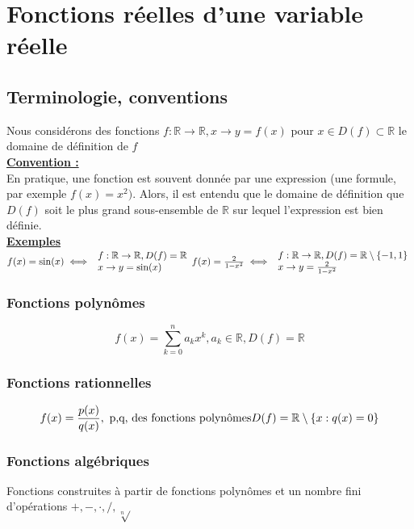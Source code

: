 \documentclass[12pt,a4paper]{article}
\newcommand{\somme}[2]{\ensuremath{\sum\limits_{#2}^{#1}}}
\newcommand{\evid}[1]{\textbf{\underline{#1}}}
\newcommand{\R}{\ensuremath{\mathbb{R}} }
\newcommand{\rtor}{\ensuremath{\R \to \R} }
\begin{document}
{\section{Fonctions réelles d'une variable réelle}
\setcounter{equation}{0}
\subsection{Terminologie, conventions}
Nous considérons des fonctions $f:\rtor, x \to y = f(x)$ pour $x \in D(f) \subset \R$ le domaine de définition de $f$\\
\evid{Convention :}\\
En pratique, une fonction est souvent donnée par une expression (une formule, par exemple $f(x) = x^2)$. Alors, il est entendu que le domaine de définition que $D(f)$ soit le plus grand sous-ensemble de \R sur lequel l'expression est bien définie.\\
\evid{Exemples}\\
$f(x) = \sin(x) \iff \begin{array}{l}
f:\rtor, D(f)	 = \R\\
x \to y = \sin(x)
\end{array}\\
f(x) = \frac{2}{1-x^2} \iff \begin{array}{l}
f:\rtor, D(f) = \R\setminus\{-1,1\}\\
x\to y = \frac{2}{1-x^2}
\end{array}$
\subsubsection{Fonctions polynômes}
\begin{equation}
	f(x) = \somme{n}{k = 0}a_k x^k, a_k \in \R, D(f) = \R
\end{equation}

\subsubsection{Fonctions rationnelles}
\begin{equation}
f(x) = \frac{p(x)}{q(x)}, \mbox{ p,q, des fonctions polynômes}\\
D(f) = \R\setminus\{x : q(x) = 0\}
\end{equation}

\subsubsection{Fonctions algébriques}
Fonctions construites à partir de fonctions polynômes et un nombre fini d'opérations $+,-,\cdot,/,\sqrt[n]{}$

}
\end{document}
